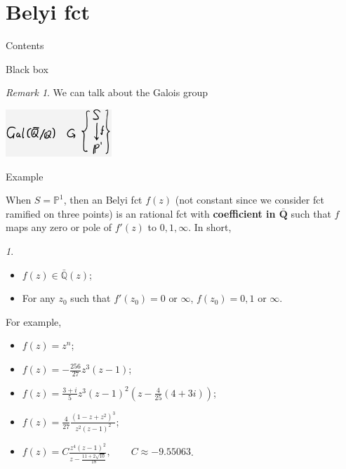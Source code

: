 \documentclass[pdf]{beamer}
\numberwithin{equation}{section}
\theoremstyle{plain}
\theoremstyle{plain}
\theoremstyle{remark}
\newtheorem{remark}[theorem]{Remark}
\newtheorem{short}{ }
\begin{document}
\section{Belyi fct}
\begin{frame}{Contents}
\tableofcontents[currentsection]
\end{frame}
\begin{frame}{Black box}
	\begin{center}
	\end{center}
\begin{remark}
	We can talk about the Galois group 
	\begin{center}
		\includegraphics[width=0.3\textwidth]{figures/Galaction.png}
	\end{center}
\end{remark}
\end{frame}
\begin{frame}{Example}

		When $S=\mathbb{P}^1$, then an Belyi fct $f(z)$ (not constant since we consider fct ramified on three points) is an rational fct with \textbf{coefficient in $\bar{\mathbf{Q}}$} such that $f$ maps any zero or pole of $f'(z)$ to $0,1,\infty$. In short,
	\begin{short}
		\begin{itemize}
			\item  $f(z) \in \bar{\mathbb{Q}}(z)$;
			\item For any $z_0$ such that $f'(z_0)=0 \text{ or } \infty$, $f(z_0)=0,1 \text{ or } \infty$.
		\end{itemize}
	\end{short}
\end{frame}
\begin{frame}
			For example,
	\begin{itemize}
		\item $f(z)=z^n$;
		\item $\displaystyle f(z)=-\frac{256}{27}z^3(z-1)$;
		\item $\displaystyle f(z)=\frac{3+i}{5}z^3(z-1)^2 \left(z-\frac{4}{25}(4+3i) \right)$;
		\item $\displaystyle f(z)=\frac{4}{27} \frac{(1-z+z^2)^3}{z^2(z-1)^2}$;
		\item $\displaystyle f(z)=C\frac{z^4 (z-1)^2}{z-\frac{11+2\sqrt{10}}{18}}, \qquad C \approx -9.55063$.
	\end{itemize}

\end{frame}
\end{document}
